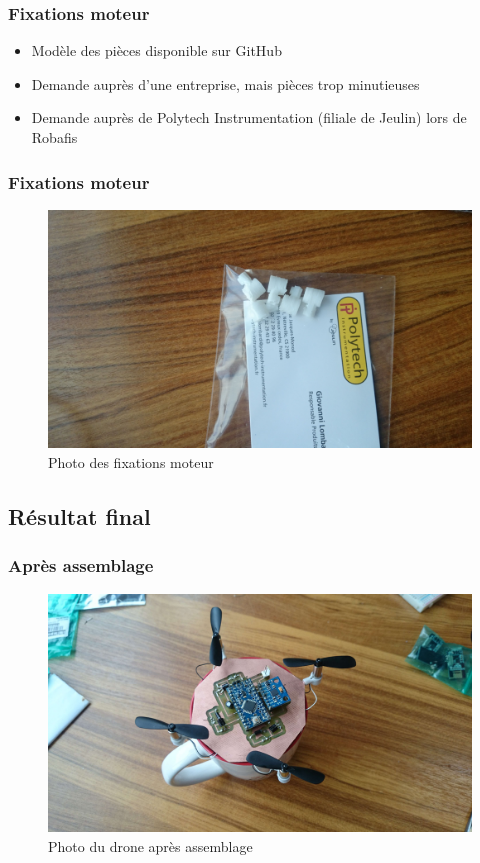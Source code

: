 \documentclass{beamer}
\begin{document}
{	\begin{frame}
	  \frametitle{Fixations moteur}
	  
	  \begin{itemize}
	    \item Modèle des pièces disponible sur GitHub
	    \item Demande auprès d'une entreprise, mais pièces trop minutieuses
	    \item Demande auprès de Polytech Instrumentation (filiale de Jeulin) lors de Robafis
	  \end{itemize}
	\end{frame}

	\begin{frame}
	  \frametitle{Fixations moteur}
	
	  \begin{figure}[htbp]
	    \centering
	    \includegraphics[scale=0.05]{img/fixations.jpg}
	    \caption{Photo des fixations moteur}
	  \end{figure} 
	\end{frame}
      
      \subsection{Résultat final}
	\begin{frame}
	  \frametitle{Après assemblage}
	  
	  \begin{figure}[htbp]
	    \centering
	    \includegraphics[scale=0.05]{img/drone_photo.jpg}
	    \caption{Photo du drone après assemblage}
	  \end{figure} 
	\end{frame}
	
}
\end{document}
